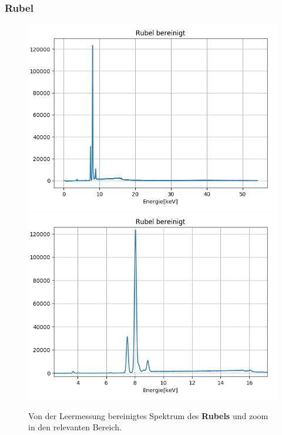 \documentclass[12pt,a4paper]{article}
\begin{document}
\subsubsection{Rubel}
\begin{figure}[H]
\centering
\includegraphics[scale=0.49]{Bilder/roentgen_spektren/rub_0.png}
\includegraphics[scale=0.49]{Bilder/roentgen_spektren/rub_1.png}
\caption{Von der Leermessung bereinigtes Spektrum des \textbf{Rubels} und zoom in den relevanten Bereich.}
\label{fig:prop_rubel}
\end{figure}
\end{document}
